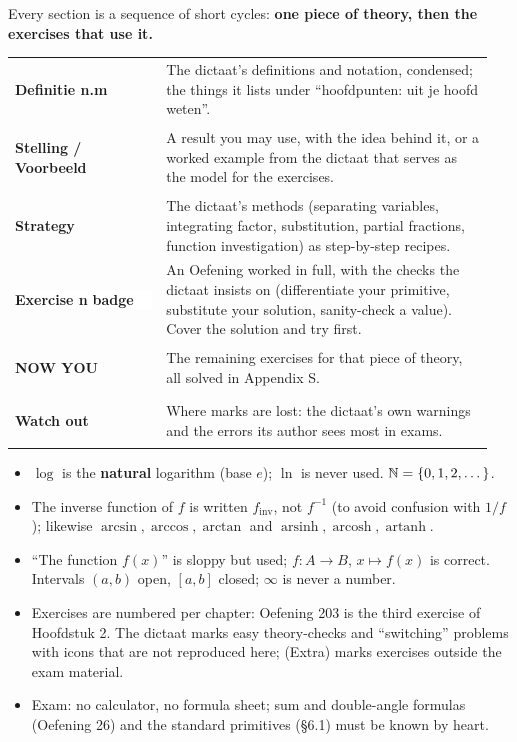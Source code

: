 \vspace{8pt}
Every section is a sequence of short cycles: \textbf{one piece of theory, then the exercises that use it.}

\begin{center}\sffamily\small
\begin{tabular}{@{}p{0.30\linewidth}p{0.65\linewidth}@{}}
\colorbox{hyellow}{\strut\textbf{Definitie n.m}} & The dictaat's definitions and notation, condensed; the things it lists under ``hoofdpunten: uit je hoofd weten''.\\[3pt]
\colorbox{hlight}{\strut\textbf{Stelling / Voorbeeld}} & A result you may use, with the idea behind it, or a worked example from the dictaat that serves as the model for the exercises.\\[3pt]
\colorbox{hgreen}{\strut\textbf{Strategy}} & The dictaat's methods (separating variables, integrating factor, substitution, partial fractions, function investigation) as step-by-step recipes.\\[3pt]
\colorbox{white}{\strut\textcolor{hblue}{\textbf{Exercise n}} \textcolor{horange}{\small\textbf{badge}}} & An Oefening worked in full, with the checks the dictaat insists on (differentiate your primitive, substitute your solution, sanity-check a value). Cover the solution and try first.\\[3pt]
\colorbox{hpurplebg}{\strut\textbf{NOW YOU}} & The remaining exercises for that piece of theory, all solved in Appendix S.\\[3pt]
\colorbox{hredbg}{\strut\textbf{Watch out}} & Where marks are lost: the dictaat's own warnings and the errors its author sees most in exams.
\end{tabular}
\end{center}

\begin{key}
\begin{itemize}
\item $\log$ is the \textbf{natural} logarithm (base $e$); $\ln$ is never used. $\mathbb{N}=\{0,1,2,\dots\}$.
\item The inverse function of $f$ is written $f_{\mathrm{inv}}$, not $f^{-1}$ (to avoid confusion with $1/f$); likewise $\arcsin,\arccos,\arctan$ and $\operatorname{arsinh},\operatorname{arcosh},\operatorname{artanh}$.
\item ``The function $f(x)$'' is sloppy but used; $f:A\to B$, $x\mapsto f(x)$ is correct. Intervals $(a,b)$ open, $[a,b]$ closed; $\infty$ is never a number.
\item Exercises are numbered per chapter: Oefening 203 is the third exercise of Hoofdstuk 2. The dictaat marks easy theory-checks and ``switching'' problems with icons that are not reproduced here; (Extra) marks exercises outside the exam material.
\item Exam: no calculator, no formula sheet; sum and double-angle formulas (Oefening 26) and the standard primitives (\S6.1) must be known by heart.
\end{itemize}
\end{key}
